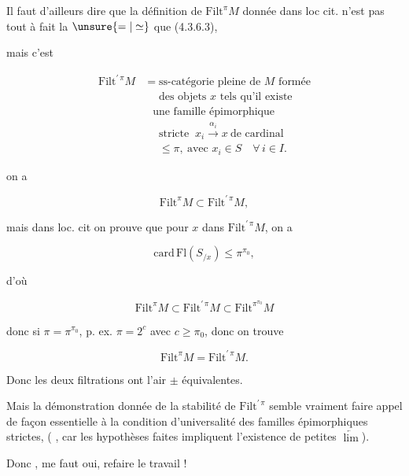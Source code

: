 Il faut d'ailleurs dire que la définition de $\mathrm{Filt}^\pi M$ donnée dans loc cit. n'est pas tout à fait la $\unsure{=|\simeq}$ que (4.3.6.3),


mais c'est

\[
\begin{aligned}
\mathrm{Filt}^{\prime\,\pi}M
&=\text{ss-catégorie pleine de }M\text{ formée}\\
&\phantom{{}={}}\text{des objets }x\text{ tels qu'il existe}\\
&\phantom{{}={}}\text{une famille épimorphique}\\
&\phantom{{}={}}\text{stricte }\ x_i\xrightarrow{\alpha_i}x\ \text{de cardinal}\\
&\phantom{{}={}}\leq\pi,\ \text{avec }x_i\in S\quad\forall\,i\in I.
\end{aligned}
\tag*{(4.3.6.3)}
\]

 on a

\[
\mathrm{Filt}^\pi M\subset\mathrm{Filt}^{\prime\,\pi}M,
\]

mais dans loc. cit on prouve que pour $x$ dans $\mathrm{Filt}^{\prime\,\pi}M$, on a

\[
\mathrm{card}\,\mathrm{Fl}(S_{/x})\leq\pi^{\pi_0},
\]

d'où

\[
\mathrm{Filt}^\pi M\subset\mathrm{Filt}^{\prime\,\pi}M\subset\mathrm{Filt}^{\pi^{\pi_0}}M
\]

donc si $\pi=\pi^{\pi_0}$, p. ex. $\pi=2^c$ avec $c\geq\pi_0$, donc on trouve

\[
\mathrm{Filt}^\pi M=\mathrm{Filt}^{\prime\,\pi}M.
\]

Donc les deux filtrations ont l'air $\pm$ équivalentes. 

Mais la démonstration donnée de la  stabilité de $\mathrm{Filt}^{\prime\,\pi}$  semble vraiment faire appel de façon essentielle à la condition d'universalité des familles épimorphiques strictes, (  , \unsure{\}} car les hypothèses faites  impliquent l'existence de petites $\underleftarrow{\lim}$).

Donc , me faut  oui,  refaire le travail !

